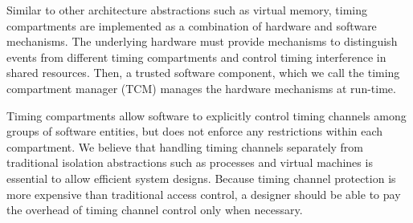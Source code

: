 
Similar to other architecture abstractions such as virtual memory,
timing compartments are implemented as a combination of hardware and software
mechanisms. The underlying hardware must provide mechanisms to distinguish
events from different timing compartments and control timing interference in 
shared resources. Then, a trusted software component, which we call the timing 
compartment manager (TCM) manages the hardware mechanisms at run-time.


Timing compartments allow software to explicitly control timing channels
among groups of software entities, but does not enforce any restrictions within
each compartment. We believe that handling timing channels separately from
traditional isolation abstractions such as processes and virtual machines is 
essential to allow efficient system designs. Because timing channel protection
is more expensive than traditional access control, a designer should be able
to pay the overhead of timing channel control only when necessary.


